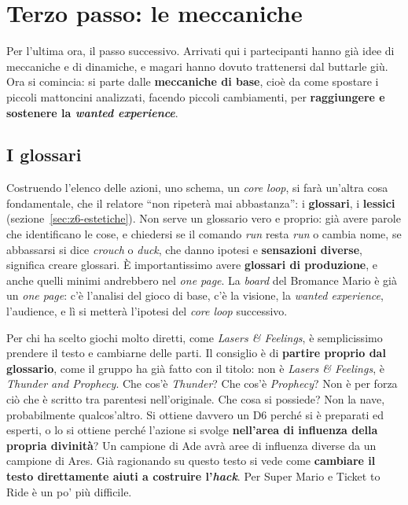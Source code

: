 \section{Terzo passo: le meccaniche}
\label{z7:sec:meccaniche}

Per l'ultima ora, il passo successivo. Arrivati qui i partecipanti hanno già idee
di meccaniche e di dinamiche, e magari hanno dovuto trattenersi dal buttarle giù.
Ora si comincia: si parte dalle \textbf{meccaniche di base}, cioè da come spostare i
piccoli mattoncini analizzati, facendo piccoli cambiamenti, per
\textbf{raggiungere e sostenere la \emph{wanted experience}}.

\subsection{I glossari}

Costruendo l'elenco delle azioni, uno schema, un \emph{core loop}, si farà
un'altra cosa fondamentale, che il relatore ``non ripeterà mai abbastanza'': i
\textbf{glossari}, i \textbf{lessici} (sezione~\ref{sec:z6-estetiche}). Non serve un
glossario vero e proprio: già avere parole che identificano le cose, e chiedersi
se il comando \emph{run} resta \emph{run} o cambia nome, se abbassarsi si dice
\emph{crouch} o \emph{duck}, che danno ipotesi e \textbf{sensazioni diverse},
significa creare glossari. È importantissimo avere \textbf{glossari di
produzione}, e anche quelli minimi andrebbero nel \emph{one page}. La \emph{board}
del Bromance Mario è già un \emph{one page}: c'è l'analisi del gioco di base, c'è
la visione, la \emph{wanted experience}, l'audience, e lì si metterà l'ipotesi del
\emph{core loop} successivo.

Per chi ha scelto giochi molto diretti, come \emph{Lasers \& Feelings}, è
semplicissimo prendere il testo e cambiarne delle parti. Il consiglio è di
\textbf{partire proprio dal glossario}, come il gruppo ha già fatto con il titolo:
non è \emph{Lasers \& Feelings}, è \emph{Thunder and Prophecy}. Che cos'è
\emph{Thunder}? Che cos'è \emph{Prophecy}? Non è per forza ciò che è scritto tra
parentesi nell'originale. Che cosa si possiede? Non la nave, probabilmente
qualcos'altro. Si ottiene davvero un D6 perché si è preparati ed esperti, o lo si
ottiene perché l'azione si svolge \textbf{nell'area di influenza della propria
divinità}? Un campione di Ade avrà aree di influenza diverse da un campione di
Ares. Già ragionando su questo testo si vede come \textbf{cambiare il testo
direttamente aiuti a costruire l'\emph{hack}}. Per Super Mario e Ticket to Ride è
un po' più difficile.

